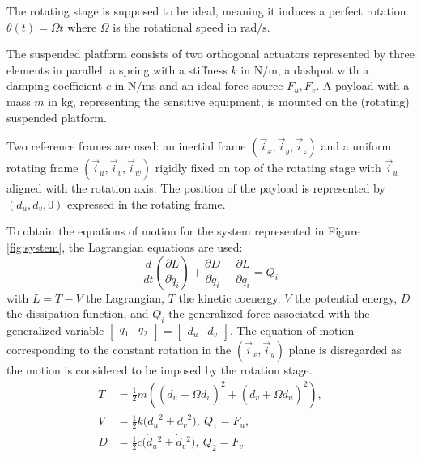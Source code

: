 \documentclass[10pt]{iopart}
\begin{document}
The rotating stage is supposed to be ideal, meaning it induces a perfect rotation \(\theta(t) = \Omega t\) where \(\Omega\) is the rotational speed in \(\si{\radian\per\second}\).

The suspended platform consists of two orthogonal actuators represented by three elements in parallel: a spring with a stiffness \(k\) in \(\si{\newton\per\meter}\), a dashpot with a damping coefficient \(c\) in \(\si{\newton\per\meter\second}\) and an ideal force source \(F_u, F_v\).
A payload with a mass \(m\) in \(\si{\kilo\gram}\), representing the sensitive equipment, is mounted on the (rotating) suspended platform.

Two reference frames are used: an inertial frame \((\vec{i}_x, \vec{i}_y, \vec{i}_z)\) and a uniform rotating frame \((\vec{i}_u, \vec{i}_v, \vec{i}_w)\) rigidly fixed on top of the rotating stage with \(\vec{i}_w\) aligned with the rotation axis.
The position of the payload is represented by \((d_u, d_v, 0)\) expressed in the rotating frame.

\par
To obtain the equations of motion for the system represented in Figure \ref{fig:system}, the Lagrangian equations are used:
\begin{equation}
\label{eq:lagrangian_equations}
  \frac{d}{dt} \left( \frac{\partial L}{\partial \dot{q}_i} \right) + \frac{\partial D}{\partial \dot{q}_i} - \frac{\partial L}{\partial q_i} = Q_i
\end{equation}
with \(L = T - V\) the Lagrangian, \(T\) the kinetic coenergy, \(V\) the potential energy, \(D\) the dissipation function, and \(Q_i\) the generalized force associated with the generalized variable \(\begin{bmatrix}q_1 & q_2\end{bmatrix} = \begin{bmatrix}d_u & d_v\end{bmatrix}\).
The equation of motion corresponding to the constant rotation in the \((\vec{i}_x, \vec{i}_y)\) plane is disregarded as the motion is considered to be imposed by the rotation stage.
\begin{equation}
\label{eq:energy_functions_lagrange}
  \begin{aligned}
    T &= \frac{1}{2} m \left( ( \dot{d}_u - \Omega d_v )^2 + ( \dot{d}_v + \Omega d_u )^2 \right), \\
    V &= \frac{1}{2} k \big( {d_u}^2 + {d_v}^2 \big), \ Q_1 = F_u, \\
    D &= \frac{1}{2} c \big( \dot{d}_u{}^2 + \dot{d}_v{}^2 \big), \ Q_2 = F_v
  \end{aligned}
\end{equation}
\end{document}
